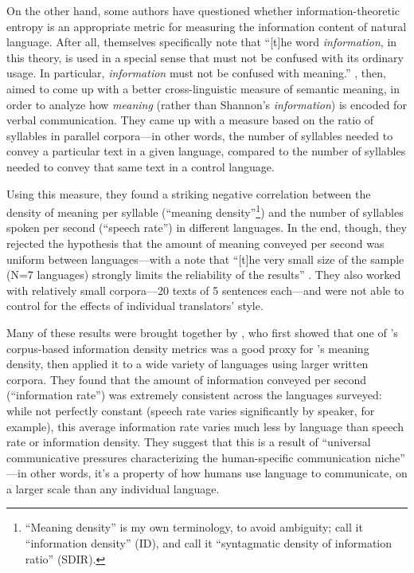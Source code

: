 \documentclass[12pt,twoside]{article}
\begin{document}
On the other hand, some authors have questioned whether information-theoretic entropy is an appropriate metric for measuring the information content of natural language. After all, \citet{shannon} themselves specifically note that ``[t]he word \emph{information}, in this theory, is used in a special sense that must not be confused with its ordinary usage. In particular, \emph{information} must not be confused with meaning.'' \citep[8]{shannon} \citet{pellegrino}, then, aimed to come up with a better cross-linguistic measure of semantic meaning, in order to analyze how \emph{meaning} (rather than Shannon's \emph{information}) is encoded for verbal communication. They came up with a measure based on the ratio of syllables in parallel corpora---in other words, the number of syllables needed to convey a particular text in a given language, compared to the number of syllables needed to convey that same text in a control language.

Using this measure, they found a striking negative correlation between the density of meaning per syllable (``meaning density''\footnote{``Meaning density'' is my own terminology, to avoid ambiguity; \citet{pellegrino} call it ``information density'' (ID), and \citet{coupé} call it ``syntagmatic density of information ratio'' (SDIR).}) and the number of syllables spoken per second (``speech rate'') in different languages. In the end, though, they rejected the hypothesis that the amount of meaning conveyed per second was uniform between languages---with a note that ``[t]he very small size of the sample (N=7 languages) strongly limits the reliability of the results'' \citep[550]{pellegrino}. They also worked with relatively small corpora---20 texts of 5 sentences each---and were not able to control for the effects of individual translators' style.

Many of these results were brought together by \citet{coupé}, who first showed that one of \citet{oh}'s corpus-based information density metrics was a good proxy for \citet{pellegrino}'s meaning density, then applied it to a wide variety of languages using larger written corpora. They found that the amount of information conveyed per second (``information rate'') was extremely consistent across the languages surveyed: while not perfectly constant (speech rate varies significantly by speaker, for example), this average information rate varies much less by language than speech rate or information density. They suggest that this is a result of ``universal communicative pressures characterizing the human-specific communication niche'' \citep[6]{coupé}---in other words, it's a property of how humans use language to communicate, on a larger scale than any individual language.
\end{document}
